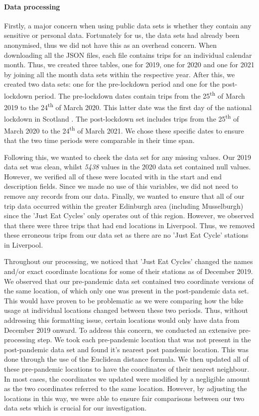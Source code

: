 \documentclass[11pt,a4paper]{article}
\begin{document}
\paragraph{Data processing} Firstly, a major concern when using public data sets is whether they contain any sensitive or personal data. Fortunately for us, the data sets had already been anonymised, thus we did not have this as an overhead concern. When downloading all the JSON files, each file contains trips for an individual calendar month. Thus, we created three tables, one for 2019, one for 2020 and one for 2021 by joining all the month data sets within the respective year. After this, we created two data sets: one for the pre-lockdown period and one for the post-lockdown period. The pre-lockdown dates contain trips from the 25\textsuperscript{th} of March 2019 to the 24\textsuperscript{th} of March 2020. This latter date was the first day of the national lockdown in Scotland \cite{timeline}. The post-lockdown set includes trips from the 25\textsuperscript{th} of March 2020 to the 24\textsuperscript{th} of March 2021. We chose these specific dates to ensure that the two time periods were comparable in their time span. 
\par Following this, we wanted to cheek the data set for any missing values. Our 2019 data set was clean, whilst \emph{5438} values in the 2020 data set contained null values. However, we verified all of these were located with in the start and end description fields. Since we made no use of this variables, we did not need to remove any records from our data. Finally, we wanted to ensure that all of our trip data occurred within the greater Edinburgh area (including Musselburgh) since the 'Just Eat Cycles' only operates out of this region. However, we observed that there were three trips that had end locations in Liverpool. Thus, we removed these erroneous trips from our data set as there are no 'Just Eat Cycle' stations in Liverpool.
\par Throughout our processing, we noticed that 'Just Eat Cycles' changed the names and/or exact coordinate locations for some of their stations as of December 2019. We observed that our pre-pandemic data set contained two coordinate versions of the same location, of which only one was present in the post-pandemic data set. This would have proven to be problematic as we were comparing how the bike usage at individual locations changed between these two periods. Thus, without addressing this formatting issue, certain locations would only have data from December 2019 onward. To address this concern, we conducted an extensive pre-processing step. We took each pre-pandemic location that was not present in the post-pandemic data set and found it's nearest post pandemic location. This was done through the use of the Euclidean distance formula. We then updated all of these pre-pandemic locations to have the coordinates of their nearest neighbour. In most cases, the coordinates we updated were modified by a negligible amount as the two coordinates referred to the same location. However, by adjusting the locations in this way, we were able to ensure fair comparisons between our two data sets which is crucial for our investigation.  
\end{document}
